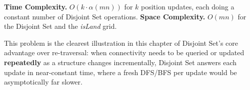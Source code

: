 \begin{complexitybox}
\textbf{Time Complexity.} $O(k \cdot \alpha(mn))$ for $k$ position
updates, each doing a constant number of Disjoint Set operations.
\textbf{Space Complexity.} $O(mn)$ for the Disjoint Set and the
\textit{isLand} grid.
\end{complexitybox}

\begin{takeawaybox}
This problem is the clearest illustration in this chapter of Disjoint
Set's core advantage over re-traversal: when connectivity needs to be
queried or updated \textbf{repeatedly} as a structure changes
incrementally, Disjoint Set answers each update in near-constant time,
where a fresh DFS/BFS per update would be asymptotically far slower.
\end{takeawaybox}
